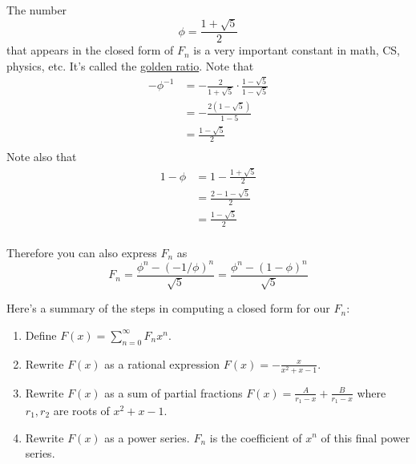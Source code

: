 The number 
\[
\phi = \frac{1 + \sqrt{5}}{2}
\]
that appears in the closed form of $F_n$ is a very important constant
in math, CS, physics, etc. It's called the 
\href{https://en.wikipedia.org/wiki/Golden_ratio}{golden ratio}.
Note that 
\begin{align*}
-\phi^{-1} 
&= -\frac{2}{1 + \sqrt{5}} \cdot \frac{1 - \sqrt{5}}{1 - \sqrt{5}} \\
&= -\frac{2(1 - \sqrt{5})}{1 - 5} \\
&= \frac{1 - \sqrt{5}}{2} \\
\end{align*}
Note also that
\begin{align*}
1 - \phi
&= 1 - \frac{1 + \sqrt{5}}{2} \\
&= \frac{2 - 1 - \sqrt{5}}{2} \\
&= \frac{1 - \sqrt{5}}{2} \\
\end{align*}

Therefore you can also express $F_n$ as 
\[
F_n = 
\frac{
\phi^n
-
(-1/\phi)^n}
{\sqrt{5}}
=
\frac
{\phi^n - (1-\phi)^n}
{\sqrt{5}}
\]

Here's a summary of the steps in computing a closed form
for our $F_n$:
\begin{enumerate}[nosep]
\item Define $F(x) = \sum_{n=0}^\infty F_n x^n$.
\item Rewrite $F(x)$ as a rational expression
  $F(x) = -\frac{x}{x^2 + x -1}$. 
\item Rewrite $F(x)$ as a sum of partial fractions
  $F(x) = \frac{A}{r_1 - x} + \frac{B}{r_1 - x}$ where $r_1, r_2$
  are roots of $x^2 + x -1$.
\item Rewrite $F(x)$ as a power series. $F_n$ is the coefficient of
  $x^n$ of this final power series.
\end{enumerate}

